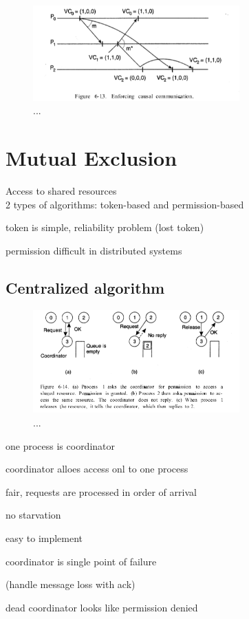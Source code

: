\documentclass[ngerman,a4paper]{report}
\begin{document}
\begin{figure}[h]
	\centering
	\includegraphics[width=300px]{gfx/vector-clock.png}
	\caption{...}
	\label{img:vector-clock}
\end{figure}


\chapter{Mutual Exclusion}
Access to shared resources\\
2 types of algorithms: token-based and permission-based
\begin{compactitem}
	\item token is simple, reliability problem (lost token)
	\item permission difficult in distributed systems
\end{compactitem}

\section{Centralized algorithm}
\begin{figure}[h]
	\centering
	\includegraphics[width=300px]{gfx/mutex-centralized.png}
	\caption{...}
	\label{img:mutex-centralized}
\end{figure}

\begin{compactitem}
	\item one process is coordinator
	\item coordinator alloes access onl to one process
	\item fair, requests are processed in order of arrival
	\item no starvation
	\item easy to implement
	\item coordinator is single point of failure
	\item (handle message loss with ack)
	\item dead coordinator looks like permission denied
\end{compactitem}
\end{document}
